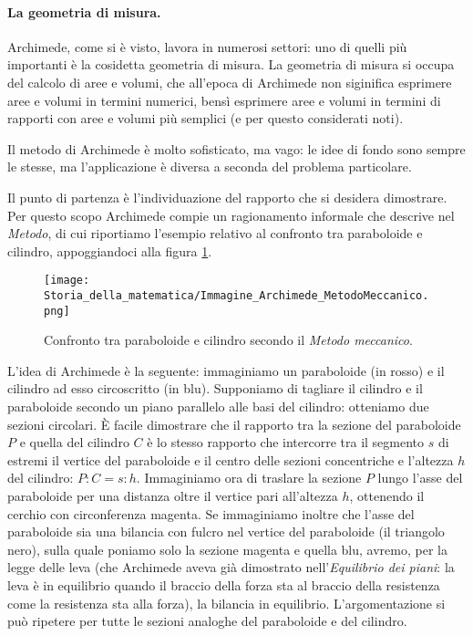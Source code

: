 \paragraph{La geometria di misura.} Archimede, come si \`e visto, lavora in numerosi settori: uno di quelli pi\`u importanti \`e la cosidetta geometria di misura. La geometria di misura si occupa del calcolo di aree e volumi, che all'epoca di Archimede non siginifica esprimere aree e volumi in termini numerici, bens\`i esprimere aree e volumi in termini di rapporti con aree e volumi pi\`u semplici (e per questo considerati noti).
\par Il metodo di Archimede \`e molto sofisticato, ma vago: le idee di fondo sono sempre le stesse, ma l'applicazione \`e diversa a seconda del problema particolare.
\par Il punto di partenza \`e l'individuazione del rapporto che si desidera dimostrare. Per questo scopo Archimede compie un ragionamento informale che descrive nel \textit{Metodo}, di cui riportiamo l'esempio relativo al confronto tra paraboloide e cilindro, appoggiandoci alla figura \ref{Archimede_MetodoMeccanico}.
\begin{figure}
	\texttt{[image: Storia\_della\_matematica/Immagine\_Archimede\_MetodoMeccanico.png]}
	\centering
	\caption{Confronto tra paraboloide e cilindro secondo il \textit{Metodo meccanico}.}
	\label{Archimede_MetodoMeccanico}
\end{figure}
\par L'idea di Archimede \`e la seguente: immaginiamo un paraboloide (in rosso) e il cilindro ad esso circoscritto (in blu). Supponiamo di tagliare il cilindro e il paraboloide secondo un piano parallelo alle basi del cilindro: otteniamo due sezioni circolari. \`E facile dimostrare che il rapporto tra la sezione del paraboloide $P$ e quella del cilindro $C$ \`e lo stesso rapporto che intercorre tra il segmento $s$ di estremi il vertice del paraboloide e il centro delle sezioni concentriche e l'altezza $h$ del cilindro: $P:C = s: h$. Immaginiamo ora di traslare la sezione $P$ lungo l'asse del paraboloide per una distanza oltre il vertice pari all'altezza $h$, ottenendo il cerchio con circonferenza magenta. Se immaginiamo inoltre che l'asse del paraboloide sia una bilancia con fulcro nel vertice del paraboloide (il triangolo nero), sulla quale poniamo solo la sezione magenta e quella blu, avremo, per la legge delle leva (che Archimede aveva gi\`a dimostrato nell'\textit{Equilibrio dei piani}: la leva \`e in equilibrio quando il braccio della forza sta al braccio della resistenza come la resistenza sta alla forza), la bilancia in equilibrio. L'argomentazione si pu\`o ripetere per tutte le sezioni analoghe del paraboloide e del cilindro.
